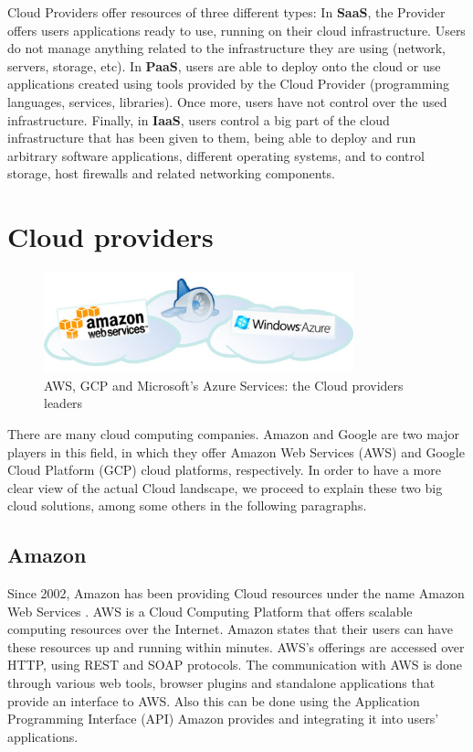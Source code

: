 Cloud Providers offer resources of three different types: In \textbf{SaaS}, the Provider offers users applications ready to use, running on their cloud infrastructure. Users do not manage anything related to the infrastructure they are using (network, servers, storage, etc). In \textbf{PaaS}, users are able to deploy onto the cloud or use applications created using tools provided by the Cloud Provider (programming languages, services, libraries). Once more, users have not control over the used infrastructure. Finally, in \textbf{IaaS}, users control a big part of the cloud infrastructure that has been given to them, being able to deploy and run arbitrary software applications, different operating systems, and to control storage, host firewalls and related networking components.



\section{Cloud providers}

\begin{figure}[htb]
\centering
\includegraphics[width=0.8\textwidth]{./images/clouds.jpg}
\caption{AWS, GCP and Microsoft's Azure Services: the Cloud providers leaders} \label{fig:bigData}
\end{figure}


There are many cloud computing companies. Amazon and Google are two major players in this field, in which they offer Amazon Web Services (AWS) and Google Cloud Platform (GCP) cloud platforms, respectively. In order to have a more clear view of the actual Cloud landscape, we proceed to explain these two big cloud solutions, among some others in the following paragraphs.

\subsection{Amazon}
Since 2002, Amazon has been providing Cloud resources under the name Amazon Web Services \cite{amazon:aws}. AWS is a Cloud Computing Platform that offers scalable computing resources over the Internet. Amazon states that their users can have these resources up and running within minutes. AWS's offerings are accessed over HTTP, using REST and SOAP protocols. The communication with AWS is done through various web tools, browser plugins and standalone applications that provide an interface to AWS. Also this can be done using the Application Programming Interface (API) Amazon provides and integrating it into users' applications.

